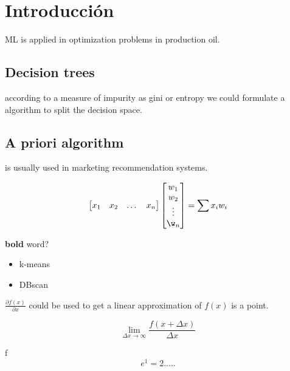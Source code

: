 \documentclass[12pt,a4paper]{article}
\author{DIego}
\begin{document}
\section*{Introducción}

ML is applied in optimization problems in production oil.

\subsection{Decision trees}

according to a measure of impurity as gini or entropy we could formulate a algorithm to split the decision space.

\subsection{A priori algorithm}
is usually used in marketing recommendation systems.

\[
\begin{bmatrix}
x_{1} & x_{2} & \dots & x_{n}
\end{bmatrix}
\begin{bmatrix}
w_{1} \\
w_{2} \\
\vdots \\
\w_{n}
\end{bmatrix}
= 
\sum x_{i} w_{i}
\]

\textbf{bold} word?

\begin{itemize}
\item k-means
\item DBscan
\end{itemize}

$\frac{\partial f(x) }{\partial x}$ could be used to get a linear approximation of $f(x)$ is a point.

\begin{equation}
\lim_{ \Delta x \to \infty} \frac{f(x+\Delta x)}{\Delta x}
\end{equation}

f\begin{equation}
e^{1} = 2.....
\end{equation}
\end{document}

